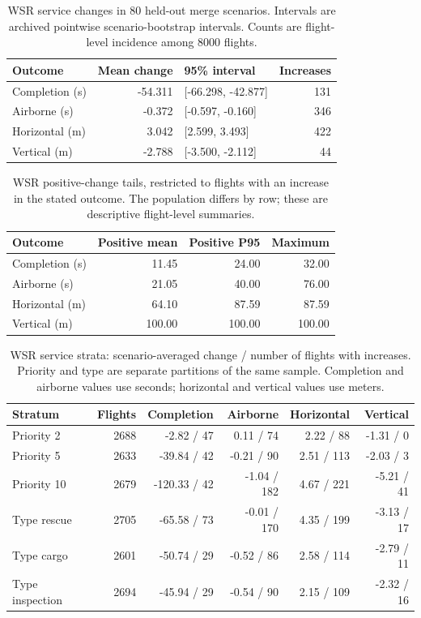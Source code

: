 \begin{table}[!htbp]
\centering\small
\caption{WSR service changes in 80 held-out merge scenarios. Intervals are archived pointwise scenario-bootstrap intervals. Counts are flight-level incidence among 8000 flights.}\label{tab:service-detail}
\begin{tabularx}{\textwidth}{L R L R}
\toprule
Outcome & Mean change & 95\% interval & Increases\\\midrule
Completion (s) & -54.311 & [-66.298, -42.877] & 131\\
Airborne (s) & -0.372 & [-0.597, -0.160] & 346\\
Horizontal (m) & 3.042 & [2.599, 3.493] & 422\\
Vertical (m) & -2.788 & [-3.500, -2.112] & 44\\
\bottomrule
\end{tabularx}
\end{table}
\begin{table}[!htbp]
\centering\small
\caption{WSR positive-change tails, restricted to flights with an increase in the stated outcome. The population differs by row; these are descriptive flight-level summaries.}\label{tab:service-tails}
\begin{tabularx}{\textwidth}{L R R R}
\toprule
Outcome & Positive mean & Positive P95 & Maximum\\\midrule
Completion (s) & 11.45 & 24.00 & 32.00\\
Airborne (s) & 21.05 & 40.00 & 76.00\\
Horizontal (m) & 64.10 & 87.59 & 87.59\\
Vertical (m) & 100.00 & 100.00 & 100.00\\
\bottomrule
\end{tabularx}
\end{table}
\begin{table}[!htbp]
\centering\small
\caption{WSR service strata: scenario-averaged change / number of flights with increases. Priority and type are separate partitions of the same sample. Completion and airborne values use seconds; horizontal and vertical values use meters.}\label{tab:service-strata}
\begin{tabularx}{\textwidth}{L r R R R R}
\toprule
Stratum & Flights & Completion & Airborne & Horizontal & Vertical\\\midrule
Priority 2 & 2688 & -2.82 / 47 & 0.11 / 74 & 2.22 / 88 & -1.31 / 0\\
Priority 5 & 2633 & -39.84 / 42 & -0.21 / 90 & 2.51 / 113 & -2.03 / 3\\
Priority 10 & 2679 & -120.33 / 42 & -1.04 / 182 & 4.67 / 221 & -5.21 / 41\\
Type rescue & 2705 & -65.58 / 73 & -0.01 / 170 & 4.35 / 199 & -3.13 / 17\\
Type cargo & 2601 & -50.74 / 29 & -0.52 / 86 & 2.58 / 114 & -2.79 / 11\\
Type inspection & 2694 & -45.94 / 29 & -0.54 / 90 & 2.15 / 109 & -2.32 / 16\\
\bottomrule
\end{tabularx}
\end{table}
